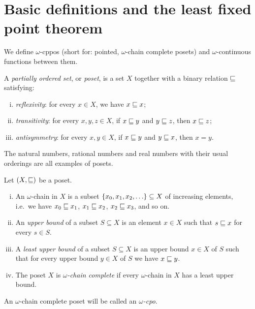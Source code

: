\section{Basic definitions and the least fixed point theorem}

We define \(\omega\)-cppos (short for: pointed,
\(\omega\)-chain complete posets) and \(\omega\)\nobreakdash-continuous
functions between them.

\begin{definition}[Poset]
  A \emph{partially ordered set}, or \emph{poset}, is a set \(X\) together with
  a binary relation \({\sqsubseteq}\) satisfying:
  \begin{enumerate}[(i)]
  \item \emph{reflexivity}: for every \(x \in X\), we have \(x \sqsubseteq x\);
  \item \emph{transitivity}: for every \(x,y,z \in X\), if \(x \sqsubseteq y\) and
    \(y \sqsubseteq z\), then \(x \sqsubseteq z\);
  \item \emph{antisymmetry}: for every \(x,y \in X\), if \(x \sqsubseteq y\) and
    \(y \sqsubseteq x\), then \(x = y\). \qedhere
  \end{enumerate}
\end{definition}

\begin{example}
  The natural numbers, rational numbers and real numbers with their usual
  orderings are all examples of posets.
\end{example}

\begin{definition}
  Let \((X,{\sqsubseteq})\) be a poset.
  \begin{enumerate}[(i)]
  \item An \(\omega\)-chain in \(X\) is a subset
    \(\set{x_0,x_1,x_2,\dots} \subseteq X\) of increasing elements, i.e.\ we
    have \(x_0 \sqsubseteq x_1\), \(x_1 \sqsubseteq x_2\), \(x_2 \sqsubseteq x_3\), and so
    on.%
  \item An \emph{upper bound} of a subset \(S \subseteq X\) is an element
    \(x \in X\) such that \(s \sqsubseteq x\) for every \(s \in S\).
  \item A \emph{least upper bound} of a subset \(S \subseteq X\) is an upper
    bound \(x \in X\) of \(S\) such that for every upper bound \(y \in X\) of
    \(S\) we have \(x \sqsubseteq y\).
  \item The poset \(X\) is \emph{\(\omega\)-chain complete} if every
    \(\omega\)-chain in \(X\) has a least upper bound.%
  \end{enumerate}
  An \(\omega\)-chain complete poset will be called an \emph{\(\omega\)-cpo}.
\end{definition}

